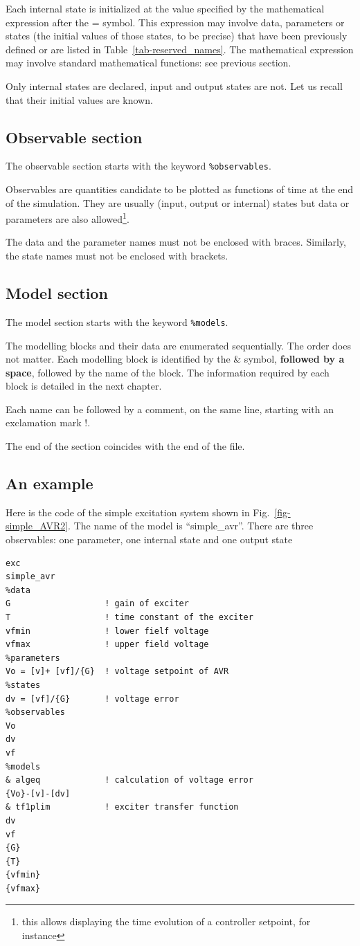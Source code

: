 Each internal state is initialized at the value specified by the mathematical expression after the = symbol. This expression may involve data, parameters or states (the initial values of those states, to be precise) that have been previously defined or are listed in Table~\ref{tab-reserved_names}. The mathematical expression may involve standard mathematical functions: see previous section.

Only internal states are declared, input and output states are not. Let us recall that their initial values are known.


\subsection{Observable section}

The observable section starts with the keyword {\tt \%observables}.

Observables are quantities candidate to be plotted as functions of time at the end of the simulation. They are usually (input, output or internal) states but data or parameters are also allowed\footnote{this  allows displaying the time evolution of a controller setpoint, for instance}.

The data and the parameter names must not be enclosed with braces. Similarly, the state names must not be enclosed with brackets.


\subsection{Model section}

The model section starts with the keyword {\tt \%models}.

The modelling blocks and their data are enumerated sequentially. The order does not matter. Each modelling block is identified by the \& symbol, {\large \bf followed by a space}, followed by the name of the block. The information required by each block is detailed in the next chapter.

Each name can be followed by a comment, on the same line, starting with an exclamation mark !.

The end of the section coincides with the end of the file.


\subsection{An example}

Here is the code of the simple excitation system shown in Fig.~\ref{fig-simple_AVR2}. The name of the model is ``simple\_avr''. There are three observables: one parameter, one internal state and one output state
\begin{verbatim}
exc
simple_avr
%data
G                   ! gain of exciter
T                   ! time constant of the exciter
vfmin               ! lower fielf voltage
vfmax               ! upper field voltage 
%parameters
Vo = [v]+ [vf]/{G}  ! voltage setpoint of AVR
%states
dv = [vf]/{G}       ! voltage error
%observables
Vo
dv
vf
%models
& algeq             ! calculation of voltage error
{Vo}-[v]-[dv]       
& tf1plim           ! exciter transfer function
dv
vf
{G}
{T}
{vfmin}
{vfmax}
\end{verbatim}

